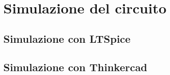 \documentclass{report}
\begin{document}
\newpage
\section{Simulazione del circuito}
\subsection{Simulazione con LTSpice}
\subsection{Simulazione con Thinkercad}
\end{document}
